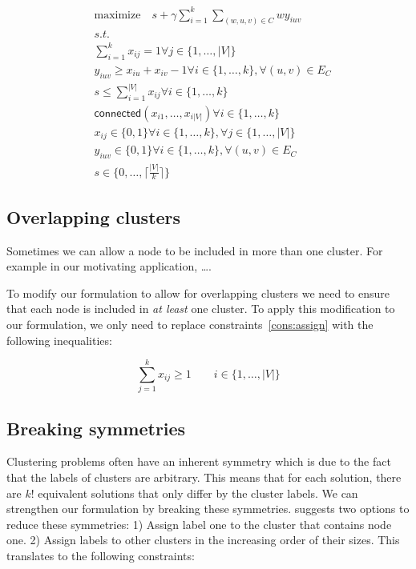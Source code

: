 \documentclass[conference,compsoc]{IEEEtran}
\begin{document}
\begin{align}
& \text{maximize} \quad s + \gamma \sum_{i=1}^{k} \sum_{(w, u, v) \in C} w  y_{iuv}  \\
&\textit{s.t.}                                                                       \nonumber \\
&\sum_{i=1}^k x_{ij} = 1                                                             \forall j \in \{1, \ldots, |V|\} \\
& y_{iuv} \geq x_{iu} + x_{iv} -1                                                    \forall i \in \{1, \ldots, k\}, \forall (u, v) \in E_{C} \\
& s \leq \sum_{i=1}^{|V|} x_{ij}                                                     \forall i \in \{1, \ldots, k\} \\
& \mathsf{connected}(x_{i1}, \ldots, x_{i|V|})                                       \forall i \in \{1, \ldots, k\} \\
& x_{ij} \in \{0, 1\}                                                                \forall i \in \{1, \ldots, k\}, \forall j \in \{1, \ldots, |V|\} \\
& y_{iuv} \in \{0, 1\}                                                               \forall i \in \{1, \ldots, k\}, \forall (u, v) \in E_{C} \\
& s \in \{0, \ldots, \lceil \frac{|V|}{k} \rceil \}                                  
\end{align}

\subsection{Overlapping clusters}
Sometimes we can allow a node to be included in more than one cluster. For example in our motivating application, \ldots. 

To modify our formulation to allow for overlapping clusters we need to ensure that each node is included in \emph{at least} one cluster. To apply this modification to our formulation, we only need to replace constraints~\ref{cons:assign} with the following inequalities:

\begin{equation}
\sum_{j=1}^{k} x_{ij} \geq 1 \qquad i \in \{1, \ldots, |V| \}
\end{equation}

\subsection{Breaking symmetries}
Clustering problems often have an inherent symmetry which is due to the fact that the labels of clusters are arbitrary. This means that for each solution, there are $k!$ equivalent solutions that only differ by the cluster labels. We can strengthen our formulation by breaking these symmetries. \cite{SheraliD05a} suggests two options to reduce these symmetries: 1) Assign label one to the cluster that contains node one. 2) Assign labels to other clusters in the increasing order of their sizes. This translates to the following constraints:
\end{document}
